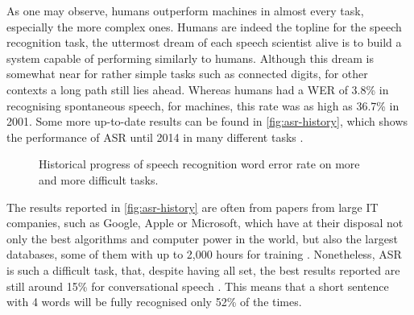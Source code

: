 As one may observe, humans outperform machines in almost every task, especially the more complex ones. 
Humans are indeed the topline for the speech recognition task, the uttermost dream of each speech 
scientist alive is to build a system capable of performing similarly to humans. Although this dream is somewhat near
for rather simple tasks such as connected digits, for other contexts a long path still lies ahead. Whereas humans had a WER of 3.8\% in recognising spontaneous speech, for machines, this rate was as high as 36.7\% in 2001. Some more up-to-date results can be found in \autoref{fig:asr-history}, which shows the performance of \ac{ASR} until 2014 in many different tasks \cite{Huang2014}. 

\begin{figure}[!ht]
        \noindent{}
        \caption{Historical progress of speech recognition word error rate on more and more
difficult tasks.}
        \label{fig:asr-history}
\end{figure}

The results reported in \autoref{fig:asr-history} are often from papers from large IT companies, such as Google, Apple or Microsoft, which have at their disposal not only the best algorithms and computer power in the world, but also the largest databases, some of them with up to 2,000 hours for training \cite{Huang2014}. Nonetheless, \ac{ASR} is such a difficult task, that, despite having all set, the best results reported are still around 15\% for conversational speech  \cite{Huang2014}. This means that a short sentence with 4 words will be fully recognised only 52\% of the times. 

